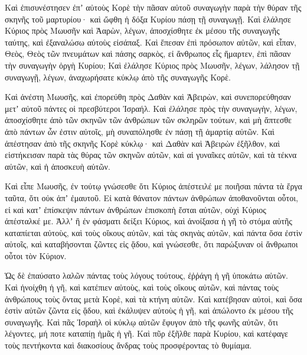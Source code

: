 {Καὶ ἐπισυνέστησεν ἐπʼ αὐτοὺς Κορὲ τὴν πᾶσαν αὐτοῦ συναγωγὴν παρὰ τὴν θύραν τῆς σκηνῆς τοῦ μαρτυρίου· καὶ ὤφθη ἡ δόξα Κυρίου πάσῃ τῇ συναγωγῇ.
Καὶ ἐλάλησε Κύριος πρὸς Μωυσῆν καὶ Ἀαρὼν, λέγων,
ἀποσχίσθητε ἐκ μέσου τῆς συναγωγῆς ταύτης, καὶ ἐξαναλώσω αὐτοὺς εἰσάπαξ.
Καὶ ἔπεσαν ἐπὶ πρόσωπον αὐτῶν, καὶ εἶπαν, Θεὸς, Θεὸς τῶν πνευμάτων καὶ πάσης σαρκὸς, εἰ ἄνθρωπος εἷς ἥμαρτεν, ἐπὶ πᾶσαν τὴν συναγωγὴν ὀργὴ Κυρίου;
Καὶ ἐλάλησε Κύριος πρὸς Μωυσῆν, λέγων,
λάλησον τῇ συναγωγῇ, λέγων, ἀναχωρήσατε κύκλῳ ἀπὸ τῆς συναγωγῆς Κορὲ.
\par }{\PP {}Καὶ ἀνέστη Μωυσῆς, καὶ ἐπορεύθη πρὸς Δαθὰν καὶ Ἀβειρὼν, καὶ συνεπορεύθησαν μετʼ αὐτοῦ πάντες οἱ πρεσβύτεροι Ἰσραήλ.
Καὶ ἐλάλησε πρὸς τὴν συναγωγὴν, λέγων, ἀποσχίσθητε ἀπὸ τῶν σκηνῶν τῶν ἀνθρώπων τῶν σκληρῶν τούτων, καὶ μὴ ἅπτεσθε ἀπὸ πάντων ὧν ἐστιν αὐτοῖς, μὴ συναπόλησθε ἐν πάσῃ τῇ ἁμαρτίᾳ αὐτῶν.
Καὶ ἀπέστησαν ἀπὸ τῆς σκηνῆς Κορὲ κύκλῳ· καὶ Δαθὰν καὶ Ἀβειρὼν ἐξῆλθον, καὶ εἱστήκεισαν παρὰ τὰς θύρας τῶν σκηνῶν αὐτῶν, καὶ αἱ γυναῖκες αὐτῶν, καὶ τὰ τέκνα αὐτῶν, καὶ ἡ ἀποσκευὴ αὐτῶν.
\par }{\PP {}Καὶ εἶπε Μωυσῆς, ἐν τούτῳ γνώσεσθε ὅτι Κύριος ἀπέστειλέ με ποιῆσαι πάντα τὰ ἔργα ταῦτα, ὅτι οὐκ ἀπʼ ἐμαυτοῦ.
Εἰ κατὰ θάνατον πάντων ἀνθρώπων ἀποθανοῦνται οὗτοι, εἰ καὶ κατʼ ἐπίσκεψιν πάντων ἀνθρώπων ἐπισκοπὴ ἔσται αὐτῶν, οὐχὶ Κύριος ἀπέσταλκέ με.
Ἀλλʼ ἢ ἐν φάσματι δείξει Κύριος, καὶ ἀνοίξασα ἡ γῆ τὸ στόμα αὐτῆς καταπίεται αὐτοὺς, καὶ τοὺς οἴκους αὐτῶν, καὶ τὰς σκηνὰς αὐτῶν, καὶ πάντα ὅσα ἐστὶν αὐτοῖς, καὶ καταβήσονται ζῶντες εἰς ᾅδου, καὶ γνώσεσθε, ὅτι παρώξυναν οἱ ἄνθρωποι οὗτοι τὸν Κύριον.
\par }{\PP {}Ὡς δὲ ἐπαύσατο λαλῶν πάντας τοὺς λόγους τούτους, ἐῤῥάγη ἡ γῆ ὑποκάτω αὐτῶν.
Καὶ ἠνοίχθη ἡ γῆ, καὶ κατέπιεν αὐτοὺς, καὶ τοὺς οἴκους αὐτῶν, καὶ πάντας τοὺς ἀνθρώπους τοὺς ὄντας μετὰ Κορὲ, καὶ τὰ κτήνη αὐτῶν.
Καὶ κατέβησαν αὐτοὶ, καὶ ὅσα ἐστὶν αὐτῶν ζῶντα εἰς ᾅδου, καὶ ἐκάλυψεν αὐτοὺς ἡ γῆ, καὶ ἀπώλοντο ἐκ μέσου τῆς συναγωγῆς.
Καὶ πᾶς Ἰσραὴλ οἱ κύκλῳ αὐτῶν ἔφυγον ἀπὸ τῆς φωνῆς αὐτῶν, ὅτι λέγοντες, μή ποτε καταπίῃ ἡμᾶς ἡ γῆ.
Καὶ πῦρ ἐξῆλθε παρὰ Κυρίου, καὶ κατέφαγε τοὺς πεντήκοντα καὶ διακοσίους ἄνδρας τοὺς προσφέροντας τὸ θυμίαμα.

}

